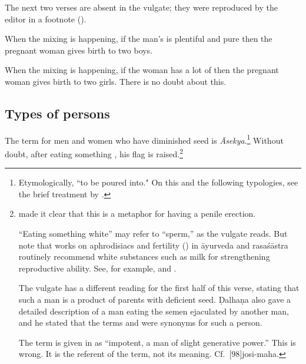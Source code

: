 \begin{translation}
{The next two verses are absent in the vulgate; they were reproduced by the 
editor in a footnote (\cite[348b, n.\,3]{vulgate}).}

\item [3.2.37.1]
\begin{sloka}
    When the mixing is happening, if the man's  is plentiful 
    and pure then the pregnant woman gives birth to two boys.
\end{sloka}

\item [3.2.37.2]
\begin{sloka}
    When the mixing is happening, if the woman has a lot of 
     then the pregnant woman gives birth to two girls.
    There is no doubt about this. 
\end{sloka}

\subsection{Types of persons}

\item[3.2.38]

The term for men and women who have diminished seed is
\emph{Āsekya}.\footnote{Etymologically, “to be poured into."  On this
    and the following typologies, see the brief treatment by
    \citet[216--217]{meul-1997}.}  Without doubt, after eating something
    , his flag is raised.\footnote{
        made it clear that this is a metaphor for having a penile
        erection.\label{erection}

“Eating something white” may refer to  “sperm,” as the
vulgate reads.  But note that works on aphrodisiacs and fertility
() in āyurveda and rasaśāstra routinely recommend
white substances such as milk for strengthening reproductive ability.
See, for example,  and .

The vulgate has a different reading for the first half of this verse, stating that 
such a man is a product of parents with deficient seed.  Ḍalhaṇa also gave a 
detailed description of a man eating the semen ejaculated by another man, 
and he stated that the terms  and  were 
synonyms for such a person.

The term  is given in \cite[161]{moni-sans} as “impotent,
a man of slight generative power.”  This is wrong.  It is the
referent of the term, not its meaning. Cf.\ [98]{josi-maha}.

}
\end{translation}
